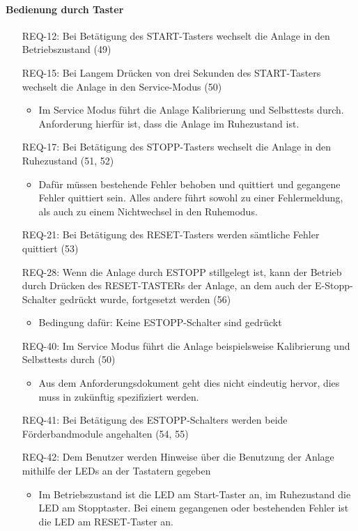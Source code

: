\paragraph{Bedienung durch Taster}
\begin{itemize}
    \item[REQ-12:] Bei Betätigung des START-Tasters wechselt die Anlage in den Betriebszustand (49)
    \item[REQ-15:] Bei Langem Drücken von drei Sekunden des START-Tasters wechselt die Anlage in den Service-Modus (50)
    \begin{itemize}
        \item Im Service Modus führt die Anlage Kalibrierung und Selbsttests durch.
        Anforderung hierfür ist, dass die Anlage im Ruhezustand ist.
    \end{itemize}
    \item[REQ-17:] Bei Betätigung des STOPP-Tasters wechselt die Anlage in den Ruhezustand (51, 52)
    \begin{itemize}
        \item Dafür müssen bestehende Fehler behoben und quittiert und gegangene Fehler quittiert sein.
        Alles andere führt sowohl zu einer Fehlermeldung, als auch zu einem Nichtwechsel in den Ruhemodus.
    \end{itemize}
    \item[REQ-21:] Bei Betätigung des RESET-Tasters werden sämtliche Fehler quittiert (53)
    \item[REQ-28:] Wenn die Anlage durch ESTOPP stillgelegt ist, kann der Betrieb durch Drücken des
    RESET-TASTERs der Anlage, an dem auch der E-Stopp-Schalter gedrückt wurde, fortgesetzt werden (56)
    \begin{itemize}
        \item Bedingung dafür: Keine ESTOPP-Schalter sind gedrückt
    \end{itemize}
    \item[REQ-40:] Im Service Modus führt die Anlage beispielsweise Kalibrierung und Selbsttests durch (50)
    \begin{itemize}
        \item Aus dem Anforderungsdokument geht dies nicht eindeutig hervor, dies muss in zukünftig spezifiziert werden.
    \end{itemize}
    \item[REQ-41:] Bei Betätigung des ESTOPP-Schalters werden beide Förderbandmodule angehalten (54, 55)
    \item[REQ-42:] Dem Benutzer werden Hinweise über die Benutzung der Anlage mithilfe der LEDs an der Tastatern gegeben
    \begin{itemize}
        \item Im Betriebszustand ist die LED am Start-Taster an, im Ruhezustand die LED am Stopptaster.
        Bei einem gegangenen oder bestehenden Fehler ist die LED am RESET-Taster an.
    \end{itemize}
\end{itemize}

